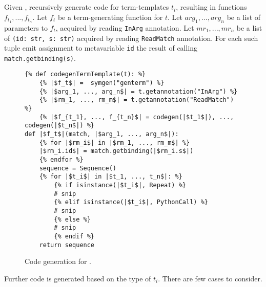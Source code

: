 \subsection{\TermSequenceNoArg}

Given \TermSequence, recursively generate code for term-templates $t_i$, resulting in functions $f_{t_1},..., f_{t_n}$. Let $f_t$ be a term-generating function for $t$. Let $arg_1, ..., arg_n$ be a list of parameters to $f_t$, acquired by reading \texttt{InArg} annotation. Let $mr_1, ..., mr_n$ be a list of \texttt{(id: str, s: str)} acquired by reading \texttt{ReadMatch} annotation. For each such tuple emit assignment to metavariable \texttt{id} the result of calling \texttt{match.getbinding(s)}.


\begin{figure}
\begin{verbatim}
{% def codegenTermTemplate(t): %}
	{% |$f_t$| =  symgen("genterm") %}
	{% |$arg_1, ..., arg_n$| = t.getannotation("InArg") %}
	{% |$rm_1, ..., rm_m$| = t.getannotation("ReadMatch") %}
	{% |$f_{t_1}, ..., f_{t_n}$| = codegen(|$t_1$|), ..., codegen(|$t_n$|) %}
def |$f_t$|(match, |$arg_1, ..., arg_n$|):
	{% for |$rm_i$| in |$rm_1, ..., rm_m$| %}
	|$rm_i.id$| = match.getbinding(|$rm_i.s$|)
	{% endfor %}
	sequence = Sequence()
	{% for |$t_i$| in |$t_1, ..., t_n$|: %}
		{% if isinstance(|$t_i$|, Repeat) %}
		# snip 
		{% elif isinstance(|$t_i$|, PythonCall) %}
		# snip
		{% else %}
		# snip
		{% endif %}
	return sequence
\end{verbatim}
\caption{Code generation for \TermSequenceNoArg.}
\label{codegen-term-sequence}
\end{figure}

Further code is generated based on the type of $t_i$. There are few cases to consider.

